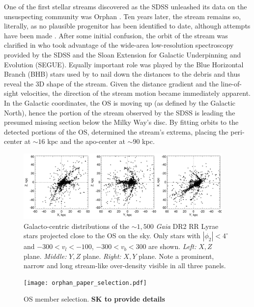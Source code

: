 \documentclass[a4paper,useAMS,usenatbib]{mnras}
\newcommand{\gaia}{\textit{Gaia} }
\begin{document}
One of the first stellar streams discovered as the SDSS unleashed its
data on the unsuspecting community was Orphan
\citep[see][]{OS_C,OS_V}. Ten years later, the stream remains so,
literally, as no plausible progenitor has been identified to date,
although attempts have been made
\citep[e.g.][]{Fellhauer2007,Jin2007,Sales2008,Casey2013,Casey2014,Grillmair2015}.
After some initial confusion, the orbit of the stream was clarified in
\citet{Newberg2010} who took advantage of the wide-area low-resolution
spectroscopy provided by the SDSS and the Sloan Extension for Galactic
Underpinning and Evolution (SEGUE). Equally important role was played
by the Blue Horizontal Branch (BHB) stars used by \citet{Newberg2010}
to nail down the distances to the debris and thus reveal the 3D shape
of the stream. Given the distance gradient and the line-of-sight
velocities, the direction of the stream motion became immediately
apparent. In the Galactic coordinates, the OS is moving up (as defined
by the Galactic North), hence the portion of the stream observed by
the SDSS is leading the presumed missing section below the Milky Way's
disc. By fitting orbits to the detected portions of the OS,
\citet{Newberg2010} determined the stream's extrema, placing the
peri-center at $\sim16$ kpc and the apo-center at $\sim90$ kpc.

%
\begin{figure}
  \centering
  \includegraphics[width=0.95\textwidth]{orphan_paper_xyz.pdf}
  \caption[]{Galacto-centric distributions of the $\sim1,500$ \gaia
    DR2 RR Lyrae stars projected close to the OS on the sky. Only
    stars with $|\phi_2|<4^{\circ}$ and $-300<v_l <-100$, $-300<v_b
    <300$ are shown. {\it Left:} $X,Z$ plane. {\it Middle:} $Y,Z$
    plane. {\it Right:} $X,Y$ plane. Note a prominent, narrow and long
    stream-like over-density visible in all three panels.}
   \label{fig:xyzgdr2}
\end{figure}
%


%
\begin{figure}
  \centering
  \texttt{[image: orphan\_paper\_selection.pdf]}
  \caption[]{OS member selection. {\bf SK to provide details}}
   \label{fig:selection}
\end{figure}
%
\end{document}
